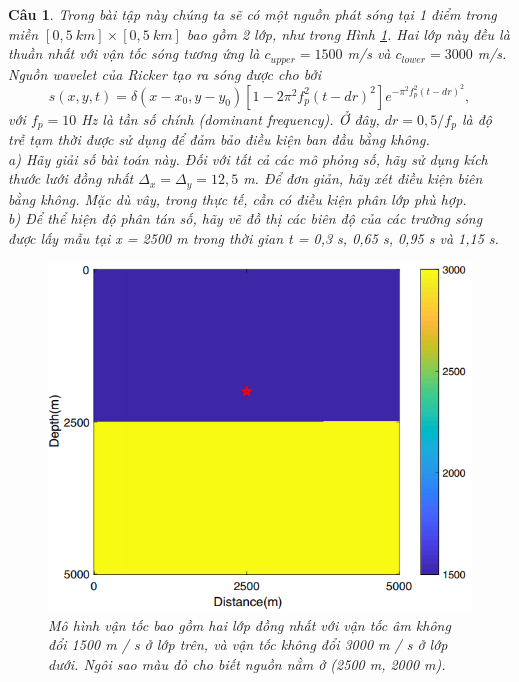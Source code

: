 \documentclass[answers]{exam}
\newtheorem{bt}{Câu}
\begin{document}
\begin{bt}
Trong bài tập này chúng ta sẽ có một nguồn phát sóng tại 1 điểm  trong miền $[0, 5 \ km ] \times [0, 5 \ km]$ bao gồm 2 lớp, như trong Hình \ref{fig:fig1}. 
Hai lớp này đều là thuần nhất với vận tốc sóng tương ứng là $c_{upper} = 1500$ m/s và $c_{lower} = 3000$ m/s. 
Nguồn wavelet của Ricker tạo ra sóng được cho bởi
%
\[
s (x, y, t) = \delta (x - x_0, y - y_0) \left[ 1 - 2\pi^2 f_p^2 (t - dr)^2\right]  e^ {- \pi^2 f_p^2 (t - dr)^2},
\]
%
với $f_p = 10$ Hz là tần số chính (dominant frequency). Ở đây, $dr = 0,5 / f_p$ là độ trễ tạm thời được sử dụng để đảm bảo điều kiện ban đầu bằng không. \\
a) Hãy giải số bài toán này. Đối với tất cả các mô phỏng số, hãy sử dụng kích thước lưới đồng nhất $\Delta_x = \Delta_y = 12,5$ m. Để đơn giản, hãy xét điều kiện biên bằng không. Mặc dù vây, trong thực tế, cần có điều kiện phân lớp phù hợp. \\
b) Để thể hiện độ phân tán số, hãy vẽ đồ thị các biên độ của các trường sóng được lấy mẫu tại x = 2500 m trong thời gian t = 0,3 s, 0,65 s, 0,95 s và 1,15 s. \\
%
\begin{figure}[h!]
	\centering
	\includegraphics[scale = 0.7]{Fig1}
	\caption[]{Mô hình vận tốc bao gồm hai lớp đồng nhất với vận tốc âm không đổi 1500 m / s ở lớp trên, và vận tốc không đổi 3000 m / s ở lớp dưới. Ngôi sao màu đỏ cho biết nguồn nằm ở (2500 m, 2000 m).}
	\label{fig:fig1}
\end{figure}
\end{bt}
\end{document}
